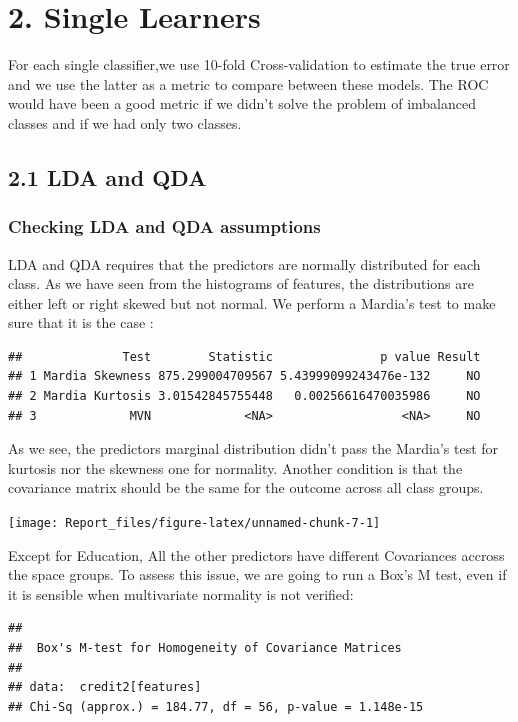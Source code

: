 \documentclass[]{article}
\begin{document}
\section{2. Single Learners}\label{single-learners}

For each single classifier,we use 10-fold Cross-validation to estimate
the true error and we use the latter as a metric to compare between
these models. The ROC would have been a good metric if we didn't solve
the problem of imbalanced classes and if we had only two classes.

\subsection{2.1 LDA and QDA}\label{lda-and-qda}

\subsubsection{Checking LDA and QDA
assumptions}\label{checking-lda-and-qda-assumptions}

LDA and QDA requires that the predictors are normally distributed for
each class. As we have seen from the histograms of features, the
distributions are either left or right skewed but not normal. We perform
a Mardia's test to make sure that it is the case :

\begin{verbatim}
##              Test        Statistic               p value Result
## 1 Mardia Skewness 875.299004709567 5.43999099243476e-132     NO
## 2 Mardia Kurtosis 3.01542845755448   0.00256616470035986     NO
## 3             MVN             <NA>                  <NA>     NO
\end{verbatim}

As we see, the predictors marginal distribution didn't pass the Mardia's
test for kurtosis nor the skewness one for normality. Another condition
is that the covariance matrix should be the same for the outcome across
all class groups.

\begin{center}\texttt{[image: Report\_files/figure-latex/unnamed-chunk-7-1]} \end{center}

Except for Education, All the other predictors have different
Covariances accross the space groups. To assess this issue, we are going
to run a Box's M test, even if it is sensible when multivariate
normality is not verified:

\begin{verbatim}
## 
##  Box's M-test for Homogeneity of Covariance Matrices
## 
## data:  credit2[features]
## Chi-Sq (approx.) = 184.77, df = 56, p-value = 1.148e-15
\end{verbatim}
\end{document}
